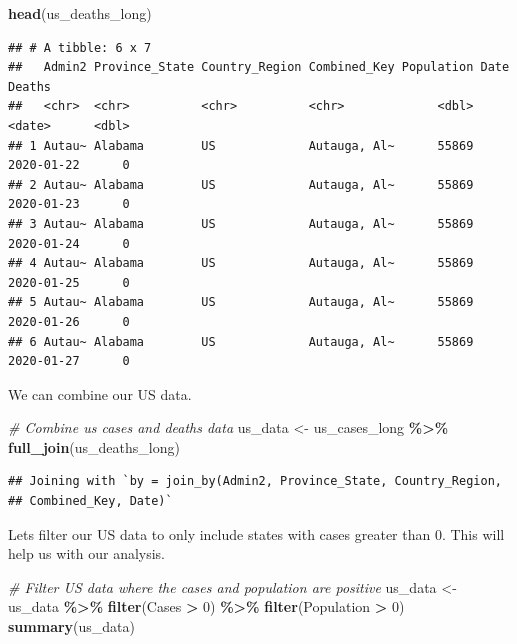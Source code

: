 \documentclass[
]{article}
\newenvironment{Shaded}{\begin{snugshade}}{\end{snugshade}}
\newcommand{\CommentTok}[1]{\textcolor[rgb]{0.56,0.35,0.01}{\textit{#1}}}
\newcommand{\DecValTok}[1]{\textcolor[rgb]{0.00,0.00,0.81}{#1}}
\newcommand{\FunctionTok}[1]{\textcolor[rgb]{0.13,0.29,0.53}{\textbf{#1}}}
\newcommand{\NormalTok}[1]{#1}
\newcommand{\OtherTok}[1]{\textcolor[rgb]{0.56,0.35,0.01}{#1}}
\newcommand{\SpecialCharTok}[1]{\textcolor[rgb]{0.81,0.36,0.00}{\textbf{#1}}}
\begin{document}
\begin{Shaded}
\begin{Highlighting}[]
\FunctionTok{head}\NormalTok{(us\_deaths\_long)}
\end{Highlighting}
\end{Shaded}

\begin{verbatim}
## # A tibble: 6 x 7
##   Admin2 Province_State Country_Region Combined_Key Population Date       Deaths
##   <chr>  <chr>          <chr>          <chr>             <dbl> <date>      <dbl>
## 1 Autau~ Alabama        US             Autauga, Al~      55869 2020-01-22      0
## 2 Autau~ Alabama        US             Autauga, Al~      55869 2020-01-23      0
## 3 Autau~ Alabama        US             Autauga, Al~      55869 2020-01-24      0
## 4 Autau~ Alabama        US             Autauga, Al~      55869 2020-01-25      0
## 5 Autau~ Alabama        US             Autauga, Al~      55869 2020-01-26      0
## 6 Autau~ Alabama        US             Autauga, Al~      55869 2020-01-27      0
\end{verbatim}

We can combine our US data.

\begin{Shaded}
\begin{Highlighting}[]
\CommentTok{\# Combine us cases and deaths data}
\NormalTok{us\_data }\OtherTok{\textless{}{-}}\NormalTok{ us\_cases\_long }\SpecialCharTok{\%\textgreater{}\%}
  \FunctionTok{full\_join}\NormalTok{(us\_deaths\_long)}
\end{Highlighting}
\end{Shaded}

\begin{verbatim}
## Joining with `by = join_by(Admin2, Province_State, Country_Region,
## Combined_Key, Date)`
\end{verbatim}

Lets filter our US data to only include states with cases greater than
0. This will help us with our analysis.

\begin{Shaded}
\begin{Highlighting}[]
\CommentTok{\# Filter US data where the cases and population are positive}
\NormalTok{us\_data }\OtherTok{\textless{}{-}}\NormalTok{ us\_data }\SpecialCharTok{\%\textgreater{}\%} \FunctionTok{filter}\NormalTok{(Cases }\SpecialCharTok{\textgreater{}} \DecValTok{0}\NormalTok{) }\SpecialCharTok{\%\textgreater{}\%} \FunctionTok{filter}\NormalTok{(Population }\SpecialCharTok{\textgreater{}} \DecValTok{0}\NormalTok{)}
\FunctionTok{summary}\NormalTok{(us\_data)}
\end{Highlighting}
\end{Shaded}
\end{document}
